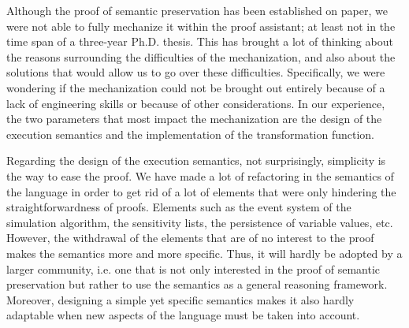 \documentclass[pdflatex,sn-mathphys]{sn-jnl}%
\theoremstyle{thmstyleone}%
\theoremstyle{thmstyletwo}%
\theoremstyle{thmstylethree}%
\begin{document}


\bigskip


Although the proof of semantic preservation has been established on
paper, we were not able to fully mechanize it within the \coq{} proof
assistant; at least not in the time span of a three-year
Ph.D. thesis. This has brought a lot of thinking about the reasons
surrounding the difficulties of the mechanization, and also about the
solutions that would allow us to go over these
difficulties. Specifically, we were wondering if the mechanization
could not be brought out entirely because of a lack of engineering
skills or because of other considerations. In our experience, the two
parameters that most impact the mechanization are the design of the
execution semantics and the implementation of the transformation
function.

Regarding the design of the execution semantics, not surprisingly,
simplicity is the way to ease the proof. We have made a lot of
refactoring in the semantics of the \hvhdl{} language in order to get
rid of a lot of elements that were only hindering the
straightforwardness of proofs. Elements such as the event system of
the \vhdl{} simulation algorithm, the sensitivity lists, the
persistence of variable values, etc. However, the withdrawal of the
elements that are of no interest to the proof makes the semantics more
and more specific. Thus, it will hardly be adopted by a larger
community, i.e. one that is not only interested in the proof of
semantic preservation but rather to use the semantics as a general
reasoning framework. Moreover, designing a simple yet specific
semantics makes it also hardly adaptable when new aspects of the
language must be taken into account.
\end{document}
